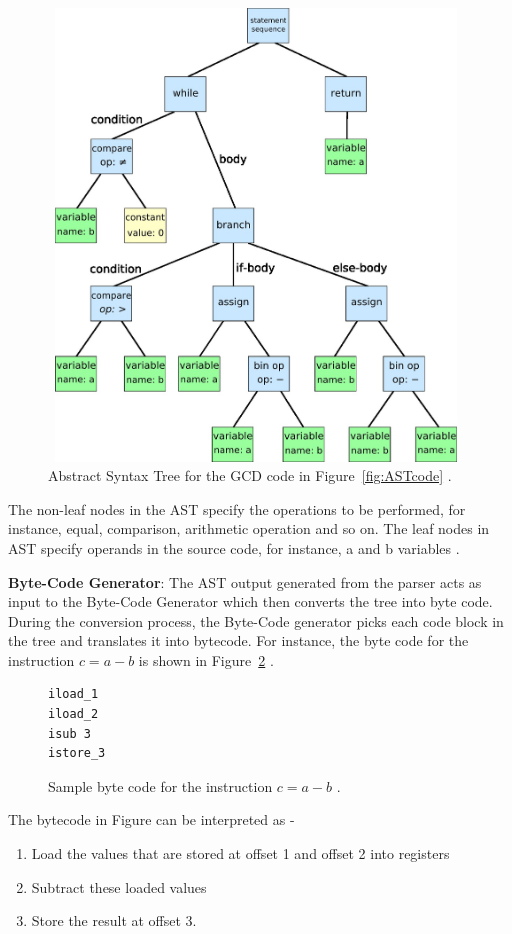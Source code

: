 \begin{figure}
  \centering
      \includegraphics[width=11cm, height=12cm]{AST.jpg}
    \caption[Abstract Syntax Tree]{Abstract Syntax Tree for the GCD code in Figure~\ref{fig:ASTcode} \cite{bib30}.}
    \label{fig:AST}
\end{figure}
The non-leaf nodes in the AST specify the operations to be performed, for instance, equal, comparison, arithmetic operation and so on. The leaf nodes in AST specify operands in the source code, for instance, a and b variables \cite{bib4}. 

\textbf{Byte-Code Generator}: The AST output generated from the parser acts as input to the Byte-Code Generator which then converts the tree into byte code. During the conversion process, the Byte-Code generator picks each code block in the tree and translates it into bytecode. For instance, the byte code for the instruction $c = a - b$ is shown in Figure~\ref{fig:samplebytecode} \cite{bib4}.

\begin{figure}
  \centering
\begin{lstlisting}
iload_1
iload_2
isub 3
istore_3
\end{lstlisting}
    \caption[Sample byte code]{Sample byte code for the instruction $c = a - b$ \cite{bib4}.}
    \label{fig:samplebytecode}
\end{figure}

The bytecode in Figure can be interpreted as - 
\begin{enumerate}
\item Load the values that are stored at offset 1 and offset 2 into registers
\item Subtract these loaded values 
\item Store the result at offset 3.
\end{enumerate}


